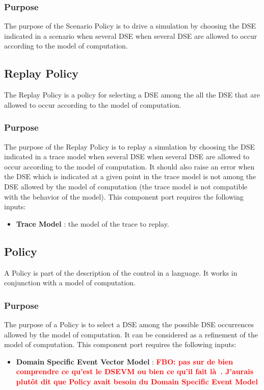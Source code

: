 \documentclass{gemoc} %
\begin{document}
\subsubsection{Purpose}
The purpose of the Scenario Policy is to drive a simulation by choosing the DSE indicated in a scenario when several DSE when several DSE are allowed to occur according to the model of computation.


\subsection{Replay Policy}
The Replay Policy is a policy for selecting a DSE among the all the DSE that are allowed to occur according to the model of computation.

\subsubsection{Purpose}
The purpose of the Replay Policy is to replay a simulation by choosing the DSE indicated in a trace model when several DSE when several DSE are allowed to occur according to the model of computation. It should also raise an error when the DSE which is indicated at a given point in the trace model is not among the DSE allowed by the model of computation (the trace model is not compatible with the behavior of the model).
This component port requires the following inputs:
\begin{itemize}
  \item \textbf{Trace Model} :
  the model of the trace to replay.
\end{itemize}


\subsection{Policy}
A Policy is part of the description of the control in a language. It works in conjunction with a model of computation.

\subsubsection{Purpose}
The purpose of a Policy is to select a DSE among the possible DSE occurrences allowed by the model of computation. It can be considered as a refinement of the model of computation.
This component port requires the following inputs:
\begin{itemize}
  \item \textbf{Domain Specific Event Vector Model} :
\textbf{\textcolor{red}{FBO: pas sur de bien comprendre ce qu'est le DSEVM ou bien ce qu'il fait là . J'aurais plutôt dit que Policy avait besoin du Domain Specific Event Model}}
\end{itemize}
\end{document}
